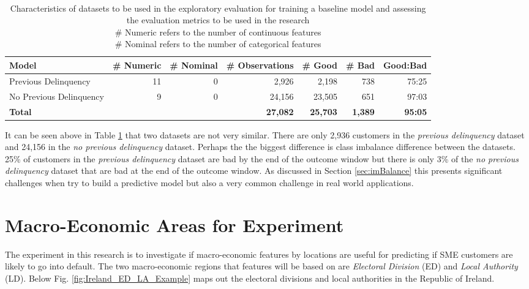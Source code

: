 \begin{table}[H]
	\centering\
	\resizebox{\textwidth}{!}
	{
		\begin{tabular}{l r r r r r r}
			\hline
			\textbf{Model} &  \textbf{\# Numeric} & \textbf{\# Nominal} & \textbf{\# Observations} & \textbf{\# Good} & \textbf{\# Bad} & \textbf{Good:Bad}\\
			\hline
			Previous Delinquency & 11 & 0 & 2,926 & 2,198  & 738 & 75:25 \\ 
			No Previous Delinquency & 9 & 0 & 24,156 & 23,505 & 651  & 97:03 \\ \hline
			\textbf{Total} &  &  & \textbf{27,082} & \textbf{25,703} & \textbf{1,389} & \textbf{95:05} \\ \hline
		\end{tabular}
	}
	\caption{Characteristics of datasets to be used in the exploratory evaluation for training a baseline model and assessing the evaluation metrics to be used in the research \\
		 \# Numeric refers to the number of continuous features \\
		 \# Nominal refers to the number of categorical features
		}
	\label{characteristicsDatasets}
\end{table}

It can be seen above in Table \ref{characteristicsDatasets} that two datasets are not very similar. There are only 2,936 customers in the \textit{previous delinquency} dataset and 24,156 in the \textit{no previous delinquency} dataset. Perhaps the the biggest difference is class imbalance difference between the datasets. 25\% of customers in the \textit{previous delinquency} dataset are bad by the end of the outcome window but there is only 3\% of the \textit{no previous delinquency} dataset that are bad at the end of the outcome window. As discussed in Section \ref{sec:imBalance} this presents significant challenges when try to build a predictive model but also a very common challenge in real world applications. 



\section{Macro-Economic Areas for Experiment}
The experiment in this research is to investigate if macro-economic features by locations are useful for predicting if SME customers are likely to go into default. The two macro-economic regions that features will be based on are \textit{Electoral Division} (ED) and \textit{Local Authority} (LD). Below Fig. \ref{fig:Ireland_ED_LA_Example} maps out the electoral divisions and local authorities in the Republic of Ireland.

